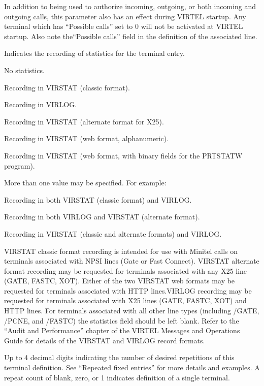 \documentclass[letterpaper,10pt,english]{sphinxmanual}
\begin{document}
\begin{description}
\sphinxAtStartPar
In addition to being used to authorize incoming, outgoing, or both incoming and outgoing calls, this parameter also has an effect during VIRTEL startup. Any terminal which has “Possible calls” set to 0 will not be activated at VIRTEL startup. Also note the“Possible calls” field in the definition of the associated line.

\sphinxAtStartPar
Indicates the recording of statistics for the terminal entry.
\begin{description}
\sphinxAtStartPar
No statistics.

\sphinxAtStartPar
Recording in VIRSTAT (classic format).

\sphinxAtStartPar
Recording in VIRLOG.

\sphinxAtStartPar
Recording in VIRSTAT (alternate format for X25).

\sphinxAtStartPar
Recording in VIRSTAT (web format, alphanumeric).

\sphinxAtStartPar
Recording in VIRSTAT (web format, with binary fields for the PRTSTATW program).

\end{description}

\sphinxAtStartPar
More than one value may be specified. For example:
\begin{description}
\sphinxAtStartPar
Recording in both VIRSTAT (classic format) and VIRLOG.

\sphinxAtStartPar
Recording in both VIRLOG and VIRSTAT (alternate format).

\sphinxAtStartPar
Recording in VIRSTAT (classic and alternate formats) and VIRLOG.

\end{description}

\sphinxAtStartPar
VIRSTAT classic format recording is intended for use with Minitel calls on terminals associated with NPSI lines (Gate or Fast Connect). VIRSTAT alternate format recording may be requested for terminals associated with any X25 line (GATE, FASTC, XOT). Either of the two VIRSTAT web formats may be requested for terminals associated with HTTP lines.VIRLOG recording may be requested for terminals associated with X25 lines (GATE, FASTC, XOT) and HTTP lines. For terminals associated with all other line types (including /GATE, /PCNE, and /FASTC) the statistics field should be left blank. Refer to the “Audit and Performance” chapter of the VIRTEL Messages and Operations Guide for details of the VIRSTAT and VIRLOG record formats.

\sphinxAtStartPar
Up to 4 decimal digits indicating the number of desired repetitions of this terminal definition. See “Repeated fixed entries” for more details and examples.
A repeat count of blank, zero, or 1 indicates definition of a single terminal.

\end{description}
\end{document}
